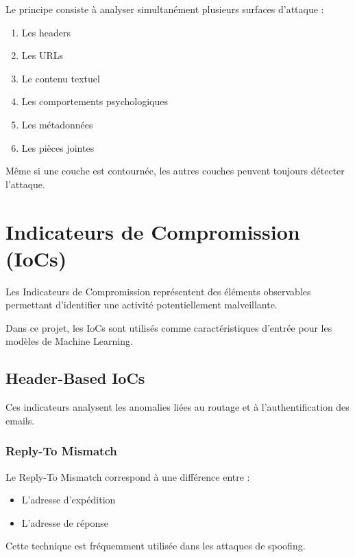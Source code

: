 \documentclass[12pt,a4paper]{article}
\begin{document}
Le principe consiste à analyser simultanément plusieurs surfaces d'attaque :

\begin{enumerate}
    \item Les headers
    \item Les URLs
    \item Le contenu textuel
    \item Les comportements psychologiques
    \item Les métadonnées
    \item Les pièces jointes
\end{enumerate}

Même si une couche est contournée, les autres couches peuvent toujours détecter l'attaque.

\section{Indicateurs de Compromission (IoCs)}

Les Indicateurs de Compromission représentent des éléments observables permettant d'identifier une activité potentiellement malveillante.

Dans ce projet, les IoCs sont utilisés comme caractéristiques d'entrée pour les modèles de Machine Learning.

\subsection{Header-Based IoCs}

Ces indicateurs analysent les anomalies liées au routage et à l'authentification des emails.

\subsubsection{Reply-To Mismatch}

Le Reply-To Mismatch correspond à une différence entre :
\begin{itemize}
    \item L'adresse d'expédition
    \item L'adresse de réponse
\end{itemize}

Cette technique est fréquemment utilisée dans les attaques de spoofing.

\end{document}
